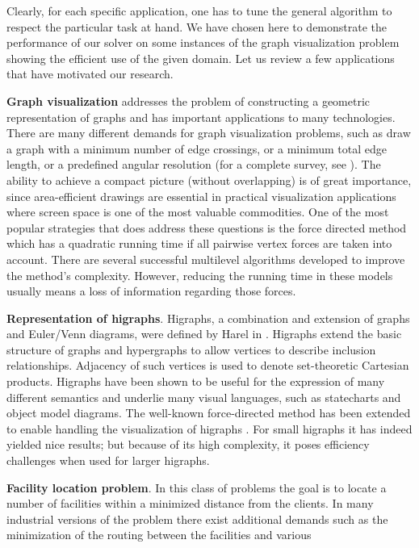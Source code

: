 \documentclass[final]{siamltex}
\begin{document}
\par Clearly, for each specific
application, one has to tune the general algorithm to respect the
particular task at hand.
We have chosen here to demonstrate the performance of our solver
on some instances of the graph visualization problem showing the
efficient use of the given domain. Let us review a few
applications that have motivated our research.
\par {\bf Graph visualization} addresses the problem of constructing a geometric representation of graphs
and has important applications to many technologies. There are
many different demands for graph visualization problems, such as
draw a graph with a minimum number of edge crossings, or a minimum
total edge length, or a predefined angular resolution (for a
complete survey, see \cite{gd-book}). The ability to achieve a
compact picture (without overlapping) is of great importance,
since area-efficient drawings are essential in practical
visualization applications where screen space is one of the most
valuable commodities. One of the most popular strategies that does
address these questions is the force directed method
\cite{eades1984} which has a quadratic running time if all
pairwise vertex forces are taken into account. There are several
successful multilevel algorithms \cite{DBLP:conf/gd/2000}
developed to improve the method's complexity. However, reducing
the running time in these models usually means a loss of
information regarding those forces.
\par {\bf Representation of higraphs}. Higraphs, a combination and extension of graphs and Euler/Venn diagrams,
were defined by Harel in \cite{harel88}. Higraphs extend the basic
structure of graphs and hypergraphs to allow vertices to describe
inclusion relationships. Adjacency of such vertices is used to
denote set-theoretic Cartesian products. Higraphs have been shown
to be useful for the expression of many different semantics and
underlie many visual languages, such as statecharts and object
model diagrams. The well-known force-directed method has been
extended to enable handling the visualization of higraphs
\cite{harelinger}. For small higraphs it has indeed yielded
nice results; but because of its high complexity, it poses efficiency
challenges when used for larger higraphs.
\par {\bf Facility location problem}. In this class of problems the goal is to locate a number
of facilities within a minimized distance from the clients. In many industrial versions of the problem
there exist additional demands such as the minimization of the routing between the facilities and various
\end{document}
